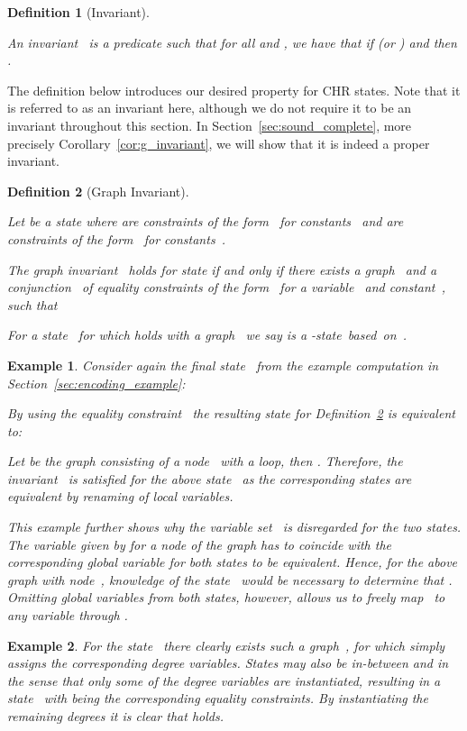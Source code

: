 \documentclass{tlp}
\newtheorem{example}{Example}[section]
\newtheorem{definition}{Definition}[section]
\begin{document}
\begin{definition}[Invariant]\label{def:invariant}

An \emph{invariant}~ is a predicate such that for all  and
, we have that if  (or ) and  then .
\end{definition}

The definition below introduces our desired property for CHR states. Note that it
is referred to as an invariant here, although we do not require it to be an
invariant throughout this section. In Section~\ref{sec:sound_complete}, more
precisely Corollary~\ref{cor:g_invariant}, we will show that it is indeed a
proper invariant.

\begin{definition}[Graph Invariant]\label{def:inv_graph}

Let  be a state where  are
constraints of the form~ for constants~ and  are constraints of
the form~ for constants~.

The \emph{graph invariant}~ holds for state  if and only if there
exists a graph~ and a conjunction~ of equality constraints of the
form~ for a variable~ and constant~, such that 

For a state~ for which  holds with a graph~ we say
 is a -\emph{state~based~on}~.
\end{definition}

\begin{example}

Consider again the final state~ from the example computation in
Section~\ref{sec:encoding_example}:


By using the equality constraint~ the resulting state for
Definition~\ref{def:inv_graph} is equivalent to: 

Let  be the graph consisting of a node~ with a loop, then . Therefore, the invariant~
is satisfied for the above state~ as the corresponding states are
equivalent by renaming of local variables.

This example further shows why the variable set~ is disregarded for the two
states. The variable given by  for a node of the graph has to coincide with
the corresponding global variable for both states to be equivalent. Hence, for
the above graph with node~, knowledge of the state~ would be
necessary to determine that . Omitting global variables from both
states, however, allows us to freely map~ to any variable through .
\end{example}

\begin{example} 

For the state~ there clearly exists such
a graph~, for which  simply assigns the corresponding degree variables.
States may also be in-between  and  in the sense
that only some of the degree variables are instantiated, resulting in a state~ with  being the corresponding equality
constraints. By instantiating the remaining degrees it is clear that
 holds.
\end{example}
\end{document}

